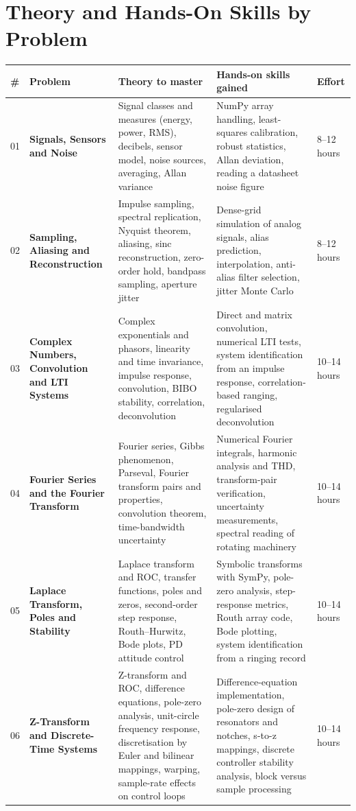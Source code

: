 \documentclass[11pt,a4paper,landscape]{article}
\begin{document}
\section*{Theory and Hands-On Skills by Problem}
{\small\renewcommand{\arraystretch}{1.25}
\begin{longtable}{@{}p{0.6cm}p{3.7cm}p{8.2cm}p{7.6cm}p{2.0cm}@{}}
\toprule \textbf{\#} & \textbf{Problem} & \textbf{Theory to master} & \textbf{Hands-on skills gained} & \textbf{Effort}\\\midrule
\endhead
01 & \textbf{Signals, Sensors and Noise} & Signal classes and measures (energy, power, RMS), decibels, sensor model, noise sources, averaging, Allan variance & NumPy array handling, least-squares calibration, robust statistics, Allan deviation, reading a datasheet noise figure & 8--12 hours\\\midrule
02 & \textbf{Sampling, Aliasing and Reconstruction} & Impulse sampling, spectral replication, Nyquist theorem, aliasing, sinc reconstruction, zero-order hold, bandpass sampling, aperture jitter & Dense-grid simulation of analog signals, alias prediction, interpolation, anti-alias filter selection, jitter Monte Carlo & 8--12 hours\\\midrule
03 & \textbf{Complex Numbers, Convolution and LTI Systems} & Complex exponentials and phasors, linearity and time invariance, impulse response, convolution, BIBO stability, correlation, deconvolution & Direct and matrix convolution, numerical LTI tests, system identification from an impulse response, correlation-based ranging, regularised deconvolution & 10--14 hours\\\midrule
04 & \textbf{Fourier Series and the Fourier Transform} & Fourier series, Gibbs phenomenon, Parseval, Fourier transform pairs and properties, convolution theorem, time-bandwidth uncertainty & Numerical Fourier integrals, harmonic analysis and THD, transform-pair verification, uncertainty measurements, spectral reading of rotating machinery & 10--14 hours\\\midrule
05 & \textbf{Laplace Transform, Poles and Stability} & Laplace transform and ROC, transfer functions, poles and zeros, second-order step response, Routh--Hurwitz, Bode plots, PD attitude control & Symbolic transforms with SymPy, pole-zero analysis, step-response metrics, Routh array code, Bode plotting, system identification from a ringing record & 10--14 hours\\\midrule
06 & \textbf{Z-Transform and Discrete-Time Systems} & Z-transform and ROC, difference equations, pole-zero analysis, unit-circle frequency response, discretisation by Euler and bilinear mappings, warping, sample-rate effects on control loops & Difference-equation implementation, pole-zero design of resonators and notches, s-to-z mappings, discrete controller stability analysis, block versus sample processing & 10--14 hours\\\midrule

\end{longtable}}
\end{document}
